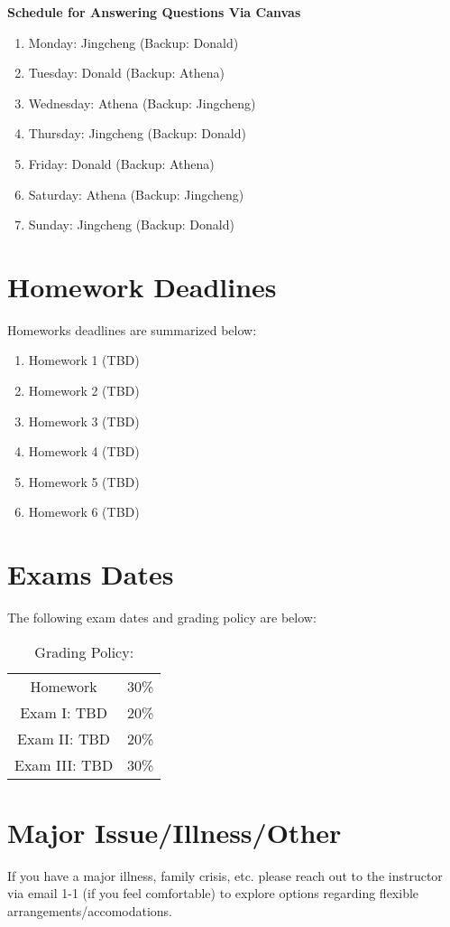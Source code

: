 \documentclass[11pt]{article}
\begin{document}
\textbf{Schedule for Answering Questions Via Canvas}
\begin{enumerate}
\item Monday: Jingcheng (Backup: Donald)
\item Tuesday: Donald (Backup: Athena)
\item Wednesday: Athena (Backup: Jingcheng)
\item Thursday: Jingcheng (Backup: Donald)
\item Friday: Donald (Backup: Athena)
\item Saturday: Athena (Backup: Jingcheng)
\item Sunday: Jingcheng (Backup: Donald)
\end{enumerate}



\section{Homework Deadlines}
Homeworks deadlines are summarized below:

\begin{enumerate}
\item Homework 1 (TBD)
\item Homework 2 (TBD)
\item Homework 3 (TBD)
\item Homework 4 (TBD)
\item Homework 5 (TBD)
\item Homework 6 (TBD)
\end{enumerate} 


\section{Exams Dates} 
The following exam dates and grading policy are below:

\begin{table}[h!]
\caption{Grading Policy:}
\begin{center}
\begin{tabular}{cc}
Homework &30\%\\
Exam I:  TBD &20\%\\
Exam  II: TBD & 20\%\\
Exam III:  TBD & 30\%\\
\end{tabular}
\end{center}
\label{default}
\end{table}%

\section{Major Issue/Illness/Other}

If you have a major illness, family crisis, etc. please reach out to the instructor via email 1-1 (if you feel comfortable) to explore options regarding flexible arrangements/accomodations.
\end{document}
